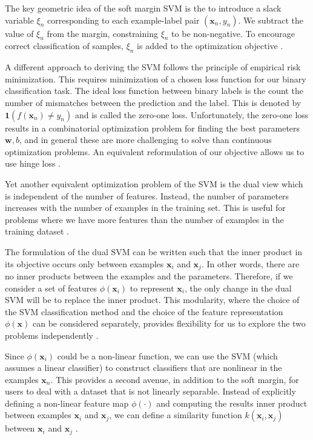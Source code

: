 \documentclass[../../../main.tex]{subfiles}
\begin{document}
The key geometric idea of the soft margin SVM is the to introduce a slack variable $\xi_n$ corresponding to each example-label pair $(\bm{x}_n,y_n)$. We subtract the value of $\xi_n$ from the margin, constraining $\xi_n$ to be non-negative. To encourage correct classification of samples, $\xi_n$ is added to the optimization objective \autocite{Deisenroth2020}.

A different approach to deriving the SVM follows the principle of empirical risk minimization. This requires minimization of a chosen loss function for our binary classification task. The ideal loss function between binary labels is the count the number of mismatches between the prediction and the label. This is denoted by $\mathbf{1}(f(\bm{x}_n) \neq y_n)$ and is called the zero-one loss. Unfortunately, the zero-one loss results in a combinatorial optimization problem for finding the best parameters $\bm{w},b$, and in general these are more challenging to solve than continuous optimization problems. An equivalent reformulation of our objective allows us to use hinge loss \autocite{Deisenroth2020}.

Yet another equivalent optimization problem of the SVM is the dual view which is independent of the number of features. Instead, the number of parameters increases with the number of examples in the training set. This is useful for problems where we have more features than the number of examples in the training dataset \autocite{Deisenroth2020}.

The formulation of the dual SVM can be written such that the inner product in its objective occurs only between examples $\bm{x}_i$ and $\bm{x}_j$. In other words, there are no inner products between the examples and the parameters. Therefore, if we consider a set of features $\phi(\bm{x}_i)$ to represent $\bm{x}_i$, the only change in the dual SVM will be to replace the inner product. This modularity, where the choice of the SVM classification method and the choice of the feature representation $\phi(\bm{x})$ can be considered separately, provides flexibility for us to explore the two problems independently \autocite{Deisenroth2020}.

Since $\phi(\bm{x}_i)$ could be a non-linear function, we can use the SVM (which assumes a linear classifier) to construct classifiers that are nonlinear in the examples $\bm{x}_n$. This provides a second avenue, in addition to the soft margin, for users to deal with a dataset that is not linearly separable. Instead of explicitly defining a non-linear feature map $\phi(\cdot)$ and computing the results inner product between examples $\bm{x}_i$ and $\bm{x}_j$, we can define a similarity function $k(\bm{x}_i,\bm{x}_j)$ between $\bm{x}_i$ and $\bm{x}_j$ \autocite{Deisenroth2020}.
\end{document}
